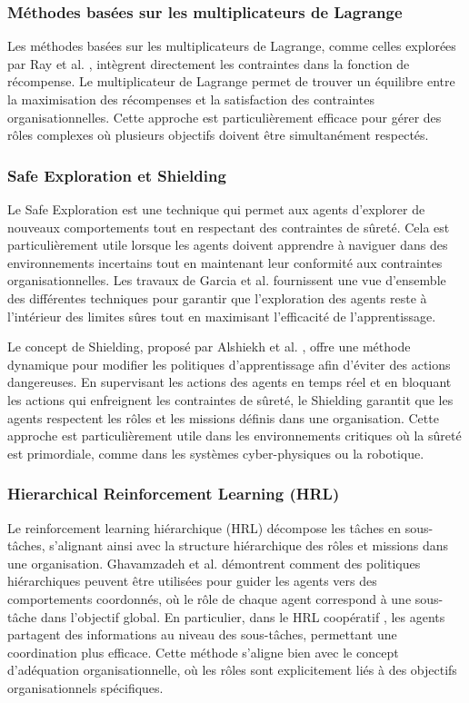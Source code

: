 \documentclass[sigconf,anonymous]{aamas}
\begin{document}
\subsubsection{Méthodes basées sur les multiplicateurs de Lagrange}
Les méthodes basées sur les multiplicateurs de Lagrange, comme celles explorées par Ray et al. \cite{ray2019benchmarking}, intègrent directement les contraintes dans la fonction de récompense. Le multiplicateur de Lagrange permet de trouver un équilibre entre la maximisation des récompenses et la satisfaction des contraintes organisationnelles. Cette approche est particulièrement efficace pour gérer des rôles complexes où plusieurs objectifs doivent être simultanément respectés.

\subsubsection{Safe Exploration et Shielding}
Le Safe Exploration est une technique qui permet aux agents d'explorer de nouveaux comportements tout en respectant des contraintes de sûreté. Cela est particulièrement utile lorsque les agents doivent apprendre à naviguer dans des environnements incertains tout en maintenant leur conformité aux contraintes organisationnelles. Les travaux de Garcia et al. \cite{garcia2015comprehensive} fournissent une vue d'ensemble des différentes techniques pour garantir que l'exploration des agents reste à l'intérieur des limites sûres tout en maximisant l'efficacité de l'apprentissage.

Le concept de Shielding, proposé par Alshiekh et al. \cite{alshiekh2018safe}, offre une méthode dynamique pour modifier les politiques d'apprentissage afin d'éviter des actions dangereuses. En supervisant les actions des agents en temps réel et en bloquant les actions qui enfreignent les contraintes de sûreté, le Shielding garantit que les agents respectent les rôles et les missions définis dans une organisation. Cette approche est particulièrement utile dans les environnements critiques où la sûreté est primordiale, comme dans les systèmes cyber-physiques ou la robotique.


\subsubsection{Hierarchical Reinforcement Learning (HRL)}
Le reinforcement learning hiérarchique (HRL) décompose les tâches en sous-tâches, s'alignant ainsi avec la structure hiérarchique des rôles et missions dans une organisation. Ghavamzadeh et al. \cite{ghavamzadeh2006hrl} démontrent comment des politiques hiérarchiques peuvent être utilisées pour guider les agents vers des comportements coordonnés, où le rôle de chaque agent correspond à une sous-tâche dans l'objectif global.
En particulier, dans le HRL coopératif \cite{ghavamzadeh2006cooperative}, les agents partagent des informations au niveau des sous-tâches, permettant une coordination plus efficace. Cette méthode s'aligne bien avec le concept d'adéquation organisationnelle, où les rôles sont explicitement liés à des objectifs organisationnels spécifiques.
\end{document}
